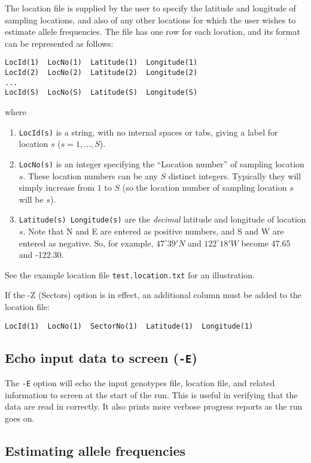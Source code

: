 \documentclass[10pt,titlepage,times,letterpaper]{article}
\begin{document}
The location file is supplied by the user to specify the latitude and
longitude of sampling locations, and also of any other locations
for which the user wishes to estimate allele frequencies.
The file has one row for each location, and its format 
can be represented as follows:
\begin{verbatim}
LocId(1)  LocNo(1)  Latitude(1)  Longitude(1)
LocId(2)  LocNo(2)  Latitude(2)  Longitude(2)
...
LocId(S)  LocNo(S)  Latitude(S)  Longitude(S)
\end{verbatim}
where
\begin{enumerate}
\item{\tt LocId(s)} is a string, with no internal spaces or tabs, giving a label for location $s$
($s = 1,\dots,S$).
\item{\tt LocNo(s)} is an integer specifying the ``Location
number'' of sampling location $s$. These location numbers can be
any $S$ distinct integers. Typically they will simply increase from $1$ to $S$
(so the location number of sampling location $s$ will be $s$). 
\item{{\tt Latitude(s) Longitude(s)}} are the {\it decimal} latitude
and longitude of location $s$. Note that N and E are entered as
positive numbers, and S and W are entered as negative. So, for
example, $47^\circ 39' N$ and $122^\circ 18' W$ become 47.65 and -122.30.
\end{enumerate}
See the example location file {\tt test.location.txt} for an illustration.

If the -Z (Sectors) option is in effect, an additional column must be added to
the location file:

\begin{small}
\begin{verbatim}
LocId(1)  LocNo(1)  SectorNo(1)  Latitude(1)  Longitude(1)
\end{verbatim}
\end{small}

\subsection{Echo input data to screen ({\tt -E})}
The {\tt -E} option will echo the input genotypes file, location file, and 
related information
to screen at the start of the run.  This is useful in verifying that the data
are read in correctly.  It also prints more verbose progress reports as
the run goes on.

\subsection{Estimating allele frequencies}
\end{document}
